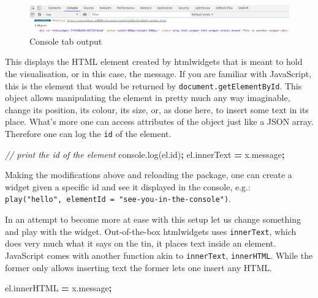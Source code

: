\documentclass[
]{krantz}
\makeatletter
\newenvironment{Shaded}{\begin{snugshade}}{\end{snugshade}}
\newcommand{\AttributeTok}[1]{\textcolor[rgb]{0.61,0.61,0.61}{#1}}
\newcommand{\CommentTok}[1]{\textcolor[rgb]{0.37,0.37,0.37}{\textit{#1}}}
\newcommand{\NormalTok}[1]{#1}
\newcommand{\OperatorTok}[1]{\textcolor[rgb]{0.43,0.43,0.43}{\textbf{#1}}}
\newcommand{\VariableTok}[1]{\textcolor[rgb]{0,0,0}{#1}}
\newenvironment{kframe}{%
\medskip{}
\setlength{\fboxsep}{.8em}
 \def\at@end@of@kframe{}%
 \ifinner\ifhmode%
  \def\at@end@of@kframe{\end{minipage}}%
  \begin{minipage}{\columnwidth}%
 \fi\fi%
 \def\FrameCommand##1{\hskip\@totalleftmargin \hskip-\fboxsep
 \colorbox{shadecolor}{##1}\hskip-\fboxsep
     \hskip-\linewidth \hskip-\@totalleftmargin \hskip\columnwidth}%
 \MakeFramed {\advance\hsize-\width
   \@totalleftmargin\z@ \linewidth\hsize
   \@setminipage}}%
 {\par\unskip\endMakeFramed%
 \at@end@of@kframe}
\renewenvironment{Shaded}{\begin{kframe}}{\end{kframe}}
\makeatother
\begin{document}
\begin{figure}
\centering
\includegraphics{images/playground-console-el.png}
\caption{Console tab output}
\end{figure}

This displays the HTML element created by htmlwidgets that is meant to hold the visualisation, or in this case, the message. If you are familiar with JavaScript, this is the element that would be returned by \texttt{document.getElementById}. This object allows manipulating the element in pretty much any way imaginable, change its position, its colour, its size, or, as done here, to insert some text in its place. What's more one can access attributes of the object just like a JSON array. Therefore one can log the \texttt{id} of the element.

\begin{Shaded}
\begin{Highlighting}[]
\CommentTok{// print the id of the element}
\VariableTok{console}\NormalTok{.}\AttributeTok{log}\NormalTok{(}\VariableTok{el}\NormalTok{.}\AttributeTok{id}\NormalTok{)}\OperatorTok{;}
\VariableTok{el}\NormalTok{.}\AttributeTok{innerText} \OperatorTok{=} \VariableTok{x}\NormalTok{.}\AttributeTok{message}\OperatorTok{;}
\end{Highlighting}
\end{Shaded}

Making the modifications above and reloading the package, one can create a widget given a specific id and see it displayed in the console, e.g.: \texttt{play("hello",\ elementId\ =\ "see-you-in-the-console")}.

In an attempt to become more at ease with this setup let us change something and play with the widget. Out-of-the-box htmlwidgets uses \texttt{innerText}, which does very much what it says on the tin, it places text inside an element. JavaScript comes with another function akin to \texttt{innerText}, \texttt{innerHTML}. While the former only allows inserting text the former lets one insert any HTML.

\begin{Shaded}
\begin{Highlighting}[]
\VariableTok{el}\NormalTok{.}\AttributeTok{innerHTML} \OperatorTok{=} \VariableTok{x}\NormalTok{.}\AttributeTok{message}\OperatorTok{;}
\end{Highlighting}
\end{Shaded}
\end{document}
